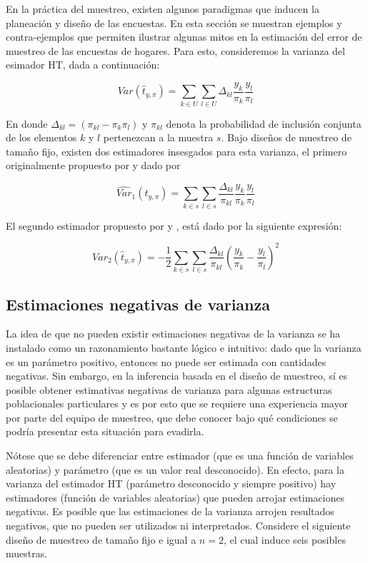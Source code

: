 \documentclass[
  12pt,
]{book}
\begin{document}
En la práctica del muestreo, existen algunos paradigmas que inducen la planeación y diseño de las encuestas. En esta sección se muestran ejemplos y contra-ejemplos que permiten ilustrar algunas mitos en la estimación del error de muestreo de las encuestas de hogares. Para esto, consideremos la varianza del esimador HT, dada a continuación:

\[
Var(\hat{t}_{y, \pi})=
\sum_{k\in U}\sum_{l\in U} \Delta_{kl}\frac{y_k}{\pi_k}\frac{y_l}{\pi_l}
\]

En donde \(\Delta_{kl} = (\pi_{kl}-\pi_k\pi_l)\) y \(\pi_{kl}\) denota la probabilidad de inclusión conjunta de los elementos \(k\) y \(l\) pertenezcan a la muestra \(s\). Bajo diseños de muestreo de tamaño fijo, existen dos estimadores insesgados para esta varianza, el primero originalmente propuesto por \citet{HT} y dado por

\[
\widehat{Var}_1(\hat{t}_{y, \pi})=
\sum_{k\in s}\sum_{l\in s} \frac{\Delta_{kl}}{\pi_{kl}}\frac{y_k}{\pi_k}\frac{y_l}{\pi_l}
\]

El segundo estimador propuesto por \citet{Sen} y \citet{YG}, está dado por la siguiente expresión:

\[
\widehat{Var}_2(\hat{t}_{y, \pi})=-\frac{1}{2}
\sum_{k\in s}\sum_{l\in s} \frac{\Delta_{kl}}{\pi_{kl}}\left(\frac{y_k}{\pi_k}-\frac{y_l}{\pi_l}\right)^2
\]

\hypertarget{estimaciones-negativas-de-varianza}{%
\subsection{Estimaciones negativas de varianza}\label{estimaciones-negativas-de-varianza}}

La idea de que no pueden existir estimaciones negativas de la varianza se ha instalado como un razonamiento bastante lógico e intuitivo: dado que la varianza es un parámetro positivo, entonces no puede ser estimada con cantidades negativas. Sin embargo, en la inferencia basada en el diseño de muestreo, sí es posible obtener estimativas negativas de varianza para algunas estructuras poblacionales particulares y es por esto que se requiere una experiencia mayor por parte del equipo de muestreo, que debe conocer bajo qué condiciones se podría presentar esta situación para evadirla.

Nótese que se debe diferenciar entre estimador (que es una función de variables aleatorias) y parámetro (que es un valor real desconocido). En efecto, para la varianza del estimador HT (parámetro desconocido y siempre positivo) hay estimadores (función de variables aleatorias) que pueden arrojar estimaciones negativas. Es posible que las estimaciones de la varianza arrojen resultados negativos, que no pueden ser utilizados ni interpretados. Considere el siguiente diseño de muestreo de tamaño fijo e igual a \(n=2\), el cual induce seis posibles muestras.
\end{document}
